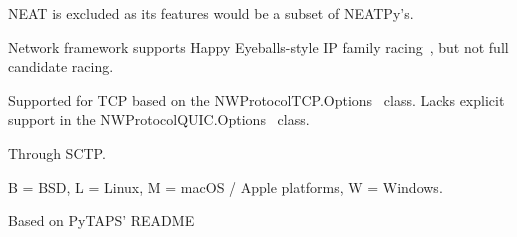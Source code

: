 \begin{table}[htbp]
\begin{threeparttable}
\begin{tabular}{lccccc}
\bottomrule
\end{tabular}
\begin{tablenotes}
    \footnotesize
    \item[1] NEAT is excluded as its features would be a subset of NEATPy's.
    \item[2] Network framework supports Happy Eyeballs-style IP family racing~\cite{networkframework_happy_eyeballs_wwdc}, but not full candidate racing.
    \item[3] Supported for TCP based on the NWProtocolTCP.Options~\cite{apple_allowfastopen} class.
        Lacks explicit support in the NWProtocolQUIC.Options~\cite{apple_nwprotocolquic} class.
    \item[4] Through SCTP.
    \item[5] B = BSD, L = Linux, M = macOS / Apple platforms, W = Windows.
    \item[6] Based on PyTAPS' README
\end{tablenotes}
\end{threeparttable}
\end{table}
